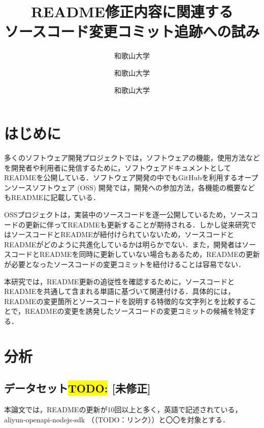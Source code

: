 \documentclass[uplatex,dvipdfmx,a4paper,twocolumn,base=11pt,jbase=11pt,ja=standard]{bxjsarticle}  %
\title{README修正内容に関連する\\ソースコード変更コミット追跡への試み}{Toward tracking source code change commits related to README revision}
\author{和歌山大学}{白﨑 優奈}{Shirasaki Yuna, Wakayama University}
\author{和歌山大学}{伊原 彰紀}{Akinori Ihara, Wakayama University}
\author{和歌山大学}{石岡 直樹}{Naoki Ishioka, Wakayama University}
\newcommand{\todo}[1]{\colorbox{yellow}{{\bf TODO}:}{\color{red} {\textbf{[#1]}}}}
\begin{document}
\maketitle


\section{はじめに}


多くのソフトウェア開発プロジェクトでは，ソフトウェアの機能，使用方法などを開発者や利用者に発信するために，ソフトウェアドキュメントとしてREADMEを公開している．ソフトウェア開発の中でもGitHubを利用するオープンソースソフトウェア (OSS) 開発では，開発への参加方法，各機能の概要などもREADMEに記載している．

OSSプロジェクトは，実装中のソースコードを逐一公開しているため，ソースコードの更新に伴ってREADMEも更新することが期待される．しかし従来研究ではソースコードとREADMEが紐付けられていないため，ソースコードとREADMEがどのように共進化しているかは明らかでない．また，開発者はソースコードとREADMEを同時に更新していない場合もあるため，READMEの更新が必要となったソースコードの変更コミットを紐付けることは容易でない．

本研究では，README更新の追従性を確認するために，ソースコードとREADMEを共通して含まれる単語に基づいて関連付ける．具体的には，READMEの変更箇所とソースコードを説明する特徴的な文字列とを比較することで，READMEの変更を誘発したソースコードの変更コミットの候補を特定する．

\section{分析}


\subsection{データセット\todo{未修正}}



本論文では，READMEの更新が10回以上と多く，英語で記述されている，aliyun-openapi-nodejs-sdk
（（TODO：リンク））と〇〇を対象とする．
\end{document}
